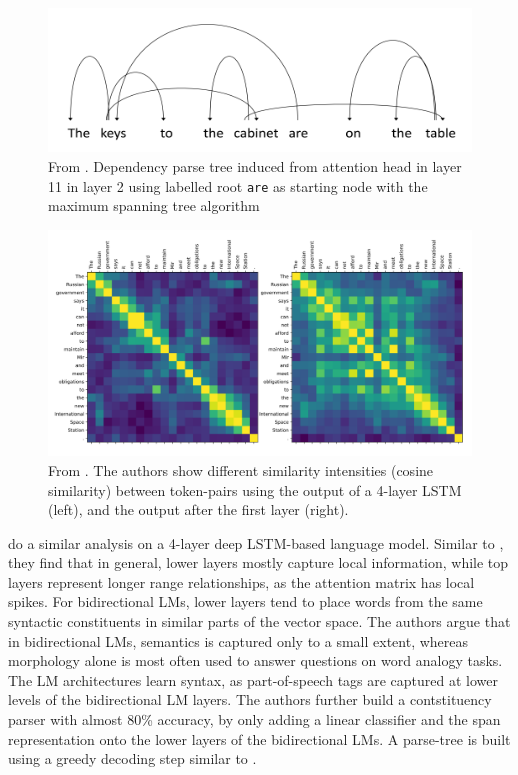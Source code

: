 \documentclass[a4paper,12pt,oneside,openright]{report}
\begin{document}
\begin{figure}
	\center
  \includegraphics[width=0.7\linewidth]{./assets/relatedwork/BERT_dependency_parsing.png}
  \caption{From \cite{jawahar19}. Dependency parse tree induced from attention head in layer 11 in layer 2 using labelled root \texttt{are} as starting node with the maximum spanning tree algorithm}
  \label{fig:parse_tree_jawahar}
\end{figure}

\begin{figure}
	\center
  \includegraphics[width=0.9\linewidth]{./assets/relatedwork/self_attention_analysis.png}
  \caption{From \cite{peters18}. The authors show different similarity intensities (cosine similarity) between token-pairs using the output of a 4-layer LSTM (left), and the output after the first layer (right).}
  \label{fig:embeddings_by_language}
\end{figure}

\cite{peters18} do a similar analysis on a 4-layer deep LSTM-based language model. 
Similar to \cite{jawahar19}, they find that in general, lower layers mostly capture local information, while top layers represent longer range relationships, as the attention matrix has local spikes.
For bidirectional LMs, lower layers tend to place words from the same syntactic constituents in similar parts of the vector space.
The authors argue that in bidirectional LMs, semantics is captured only to a small extent, whereas morphology alone is most often used to answer questions on word analogy tasks.
The LM architectures learn syntax, as part-of-speech tags are captured at lower levels of the bidirectional LM layers.
The authors further build a contstituency parser with almost 80\% accuracy, by only adding a linear classifier and the span representation onto the lower layers of the bidirectional LMs.
A parse-tree is built using a greedy decoding step similar to \cite{joshi19b}. \\
 
\end{document}
